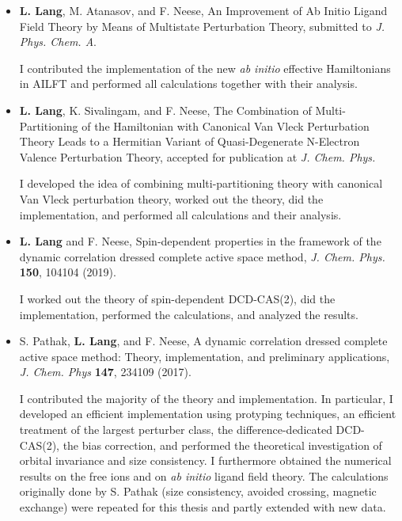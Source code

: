 \begin{itemize}
\item \textbf{L. Lang}, M. Atanasov, and F. Neese, An Improvement of Ab Initio Ligand Field Theory by Means of Multistate Perturbation Theory, submitted to \textit{J. Phys. Chem. A}.

I contributed the implementation of the new \textit{ab initio} effective Hamiltonians in AILFT and performed all calculations together with their analysis.

\item \textbf{L. Lang}, K. Sivalingam, and F. Neese, The Combination of Multi-Partitioning of the Hamiltonian with Canonical Van Vleck Perturbation Theory Leads to a Hermitian Variant of Quasi-Degenerate N-Electron Valence Perturbation Theory, accepted for publication at \textit{J. Chem. Phys.}

I developed the idea of combining multi-partitioning theory with canonical Van Vleck perturbation theory, worked out the theory, did the implementation, and performed all calculations and their analysis.

\item \textbf{L. Lang} and F. Neese, Spin-dependent properties in the framework of the dynamic correlation dressed complete active space method, \textit{J. Chem. Phys.} \textbf{150}, 104104 (2019).

I worked out the theory of spin-dependent DCD-CAS(2), did the implementation, performed the calculations, and analyzed the results.

\item S. Pathak, \textbf{L. Lang}, and F. Neese, A dynamic correlation dressed complete active space method: Theory, implementation, and preliminary applications, \textit{J. Chem. Phys} \textbf{147}, 234109 (2017).

I contributed the majority of the theory and implementation. In particular, I developed an efficient implementation using protyping techniques, an efficient treatment of the largest perturber class, the difference-dedicated DCD-CAS(2), the bias correction, and performed the theoretical investigation of orbital invariance and size consistency. I furthermore obtained the numerical results on the free ions and on \textit{ab initio} ligand field theory. The calculations originally done by S. Pathak (size consistency, avoided crossing, magnetic exchange) were repeated for this thesis and partly extended with new data.
\end{itemize}

